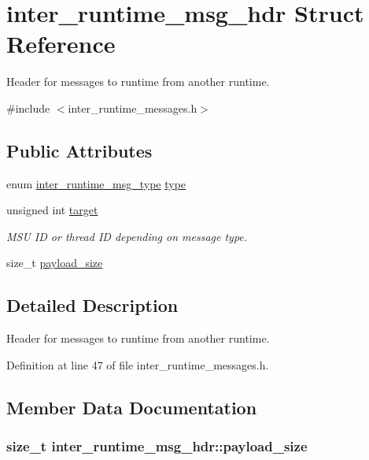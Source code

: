 \hypertarget{structinter__runtime__msg__hdr}{\section{inter\-\_\-runtime\-\_\-msg\-\_\-hdr Struct Reference}
\label{structinter__runtime__msg__hdr}
}


Header for messages to runtime from another runtime.  




{\ttfamily \#include $<$inter\-\_\-runtime\-\_\-messages.\-h$>$}

\subsection*{Public Attributes}
\begin{DoxyCompactItemize}
\item 
enum \hyperlink{inter__runtime__messages_8h_af4d9db643346db669665f73f9e1b7b63}{inter\-\_\-runtime\-\_\-msg\-\_\-type} \hyperlink{structinter__runtime__msg__hdr_aa3fd1b24d760f993758fde89bc392667}{type}
\item 
unsigned int \hyperlink{structinter__runtime__msg__hdr_ab55150bdbe4ae70e8e647f29f1568920}{target}
\begin{DoxyCompactList}\small\item\em M\-S\-U I\-D or thread I\-D depending on message type. \end{DoxyCompactList}\item 
size\-\_\-t \hyperlink{structinter__runtime__msg__hdr_a9c597e65ffc48a8b8278ddd0a0087440}{payload\-\_\-size}
\end{DoxyCompactItemize}


\subsection{Detailed Description}
Header for messages to runtime from another runtime. 

Definition at line 47 of file inter\-\_\-runtime\-\_\-messages.\-h.



\subsection{Member Data Documentation}
\hypertarget{structinter__runtime__msg__hdr_a9c597e65ffc48a8b8278ddd0a0087440}{
\subsubsection[{payload\-\_\-size}]{\setlength{\rightskip}{0pt plus 5cm}size\-\_\-t inter\-\_\-runtime\-\_\-msg\-\_\-hdr\-::payload\-\_\-size}}\label{structinter__runtime__msg__hdr_a9c597e65ffc48a8b8278ddd0a0087440}


